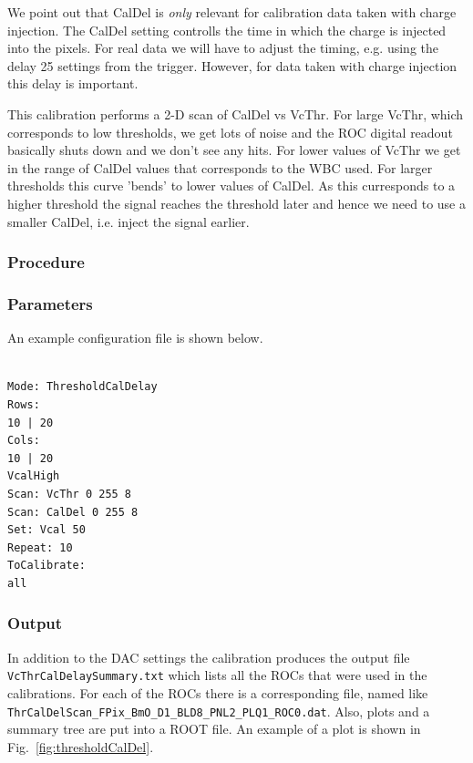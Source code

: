 We point out that CalDel is {\it only} relevant for calibration data taken with charge injection. The CalDel setting controlls the time in which the charge is injected into the pixels. For real data we will have to adjust the timing, e.g. using the delay 25 settings from the trigger. However, for data taken with charge injection this delay is important.

This calibration performs a 2-D scan of CalDel vs VcThr. For large VcThr, which corresponds to low thresholds, we get lots of noise and the ROC digital readout basically shuts down and we don't see any hits. For lower values of VcThr we get in the range of CalDel values that corresponds to the WBC used. For larger thresholds this curve 'bends' to lower values of CalDel. As this curresponds to a higher threshold the signal reaches the threshold later and hence we need to use a smaller  CalDel, i.e. inject the signal earlier.

\subsubsection{Procedure}
\subsubsection{Parameters}
An example configuration file is shown below.
\begin{verbatim}

Mode: ThresholdCalDelay
Rows:
10 | 20 
Cols:
10 | 20
VcalHigh
Scan: VcThr 0 255 8
Scan: CalDel 0 255 8
Set: Vcal 50
Repeat: 10
ToCalibrate:
all
\end{verbatim}

\subsubsection{Output}

In addition to the DAC settings the calibration produces the output file {\tt VcThrCalDelaySummary.txt} which lists all the ROCs that were used in the calibrations. For each of the ROCs there is a corresponding file, named like  {\tt ThrCalDelScan\_FPix\_BmO\_D1\_BLD8\_PNL2\_PLQ1\_ROC0.dat}. Also, plots and a summary tree are put into a ROOT file. An example of a plot is shown in Fig.~\ref{fig:thresholdCalDel}.


